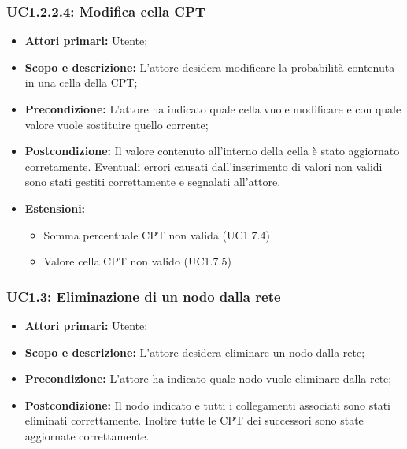 \subsubsection{UC1.2.2.4: Modifica cella CPT} 
\begin{itemize} 
	\item{\textbf{Attori primari:} Utente;} 
	\item{\textbf{Scopo e descrizione:} L'attore desidera modificare la probabilità contenuta in una cella della CPT;} 
	\item{\textbf{Precondizione:} L'attore ha indicato quale cella vuole modificare e con quale valore vuole sostituire quello corrente;} 
	\item{\textbf{Postcondizione:} Il valore contenuto all'interno della cella è stato aggiornato corretamente. Eventuali errori causati dall'inserimento di valori non validi sono stati gestiti correttamente e segnalati all'attore.}
	\item{\textbf{Estensioni:}
		\begin{itemize}
			\item{Somma percentuale CPT non valida (UC1.7.4)}
			\item{Valore cella CPT non valido (UC1.7.5)}
		\end{itemize}
	}
\end{itemize} 
\subsubsection{UC1.3: Eliminazione di un nodo dalla rete} 
\begin{itemize} 
	\item{\textbf{Attori primari:} Utente;} 
	\item{\textbf{Scopo e descrizione:} L'attore desidera eliminare un nodo dalla rete;} 
	\item{\textbf{Precondizione:} L'attore ha indicato quale nodo vuole eliminare dalla rete;} 
	\item{\textbf{Postcondizione:} Il nodo indicato e tutti i collegamenti associati sono stati eliminati correttamente. Inoltre tutte le CPT dei successori sono state aggiornate correttamente.} 
\end{itemize} 

